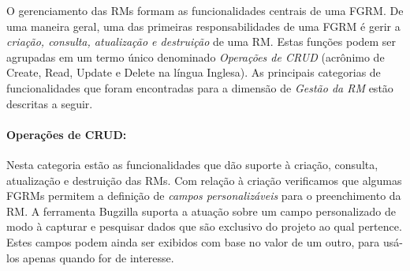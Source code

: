\begin{table}[htpb]
\centering
{}
\caption{Frequência de cada categoria de funcionalidade no conjunto de cartões
	obtidos.}
\label{tab:freq_categorias_cartoes}
\end{table}

O gerenciamento das RMs formam as funcionalidades centrais de uma FGRM\@. De uma
maneira geral, uma das primeiras responsabilidades de uma FGRM é gerir a
\textit{criação, consulta, atualização e destruição} de uma RM\@. Estas funções
podem ser agrupadas em um termo único denominado \textit{Operações de CRUD}
(acrônimo de Create, Read, Update e Delete na língua Inglesa). As principais
categorias de funcionalidades que foram encontradas para a dimensão de
\textit{Gestão da RM} estão descritas a seguir.

\paragraph{Operações de CRUD:}
\label{par:operações_de_crud}

Nesta categoria estão as funcionalidades que dão suporte à criação,	consulta,
atualização e destruição das RMs. Com relação à criação verificamos que algumas
FGRMs permitem a definição de \textit{campos personalizáveis} para o
preenchimento da RM\@. A ferramenta Bugzilla suporta a atuação sobre um campo
personalizado de modo à capturar e pesquisar dados que são exclusivo do projeto
ao qual pertence.  Estes campos podem ainda ser exibidos com base no valor de um
outro, para usá-los apenas quando for de interesse.

